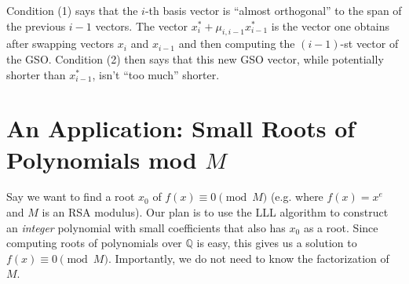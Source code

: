 \documentclass[11pt,letterpaper]{article}
\newcommand{\rationals}{\mathbb{Q}}
\theoremstyle{definition}
\begin{document}
\noindent Condition (1) says that the $i$-th basis vector is ``almost orthogonal'' to the span of the previous $i-1$ vectors. The vector $x_i^*+\mu_{i, i-1}x_{i-1}^*$ is the vector one obtains after swapping vectors $x_i$ and $x_{i-1}$ and then computing the $(i-1)$-st vector of the GSO. Condition (2) then says that this new GSO vector, while potentially shorter than $x_{i-1}^*$, isn't ``too much'' shorter.

\section{An Application: Small Roots of Polynomials mod $M$}
Say we want to find a root $x_0$ of $f(x) \equiv 0 \pmod{M}$ (e.g. where $f(x) = x^e$ and $M$ is an RSA modulus). Our plan is to use the LLL algorithm to construct an \textit{integer} polynomial with small coefficients that also has $x_0$ as a root. Since computing roots of polynomials over $\rationals$ is easy, this gives us a solution to $f(x)\equiv 0 \pmod{M}$. Importantly, we do not need to know the factorization of $M$.
\end{document}

